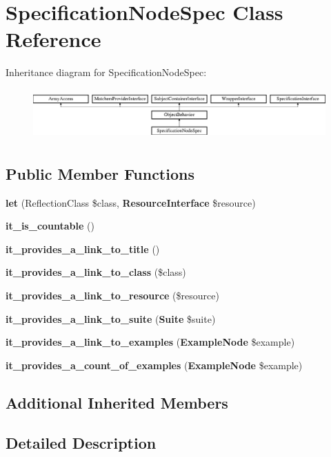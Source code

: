 \section{Specification\+Node\+Spec Class Reference}
\label{classspec_1_1_php_spec_1_1_loader_1_1_node_1_1_specification_node_spec}
Inheritance diagram for Specification\+Node\+Spec\+:\begin{figure}[H]
\begin{center}
\leavevmode
\includegraphics[height=1.953488cm]{classspec_1_1_php_spec_1_1_loader_1_1_node_1_1_specification_node_spec}
\end{center}
\end{figure}
\subsection*{Public Member Functions}
\begin{DoxyCompactItemize}
\item 
{\bf let} (Reflection\+Class \$class, {\bf Resource\+Interface} \$resource)
\item 
{\bf it\+\_\+is\+\_\+countable} ()
\item 
{\bf it\+\_\+provides\+\_\+a\+\_\+link\+\_\+to\+\_\+title} ()
\item 
{\bf it\+\_\+provides\+\_\+a\+\_\+link\+\_\+to\+\_\+class} (\$class)
\item 
{\bf it\+\_\+provides\+\_\+a\+\_\+link\+\_\+to\+\_\+resource} (\$resource)
\item 
{\bf it\+\_\+provides\+\_\+a\+\_\+link\+\_\+to\+\_\+suite} ({\bf Suite} \$suite)
\item 
{\bf it\+\_\+provides\+\_\+a\+\_\+link\+\_\+to\+\_\+examples} ({\bf Example\+Node} \$example)
\item 
{\bf it\+\_\+provides\+\_\+a\+\_\+count\+\_\+of\+\_\+examples} ({\bf Example\+Node} \$example)
\end{DoxyCompactItemize}
\subsection*{Additional Inherited Members}


\subsection{Detailed Description}


